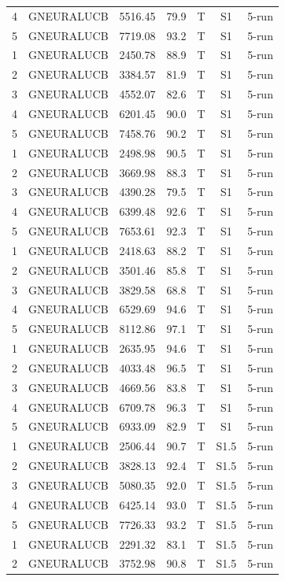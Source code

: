 \documentclass[11pt]{article}
\begin{document}
\begin{center}
\begin{longtable}{|c|c|c|c|c|c|c|}
4 & GNEURALUCB & 5516.45 & 79.9 & T & S1 & 5-run \\
5 & GNEURALUCB & 7719.08 & 93.2 & T & S1 & 5-run \\
1 & GNEURALUCB & 2450.78 & 88.9 & T & S1 & 5-run \\
2 & GNEURALUCB & 3384.57 & 81.9 & T & S1 & 5-run \\
3 & GNEURALUCB & 4552.07 & 82.6 & T & S1 & 5-run \\
4 & GNEURALUCB & 6201.45 & 90.0 & T & S1 & 5-run \\
5 & GNEURALUCB & 7458.76 & 90.2 & T & S1 & 5-run \\
1 & GNEURALUCB & 2498.98 & 90.5 & T & S1 & 5-run \\
2 & GNEURALUCB & 3669.98 & 88.3 & T & S1 & 5-run \\
3 & GNEURALUCB & 4390.28 & 79.5 & T & S1 & 5-run \\
4 & GNEURALUCB & 6399.48 & 92.6 & T & S1 & 5-run \\
5 & GNEURALUCB & 7653.61 & 92.3 & T & S1 & 5-run \\
1 & GNEURALUCB & 2418.63 & 88.2 & T & S1 & 5-run \\
2 & GNEURALUCB & 3501.46 & 85.8 & T & S1 & 5-run \\
3 & GNEURALUCB & 3829.58 & 68.8 & T & S1 & 5-run \\
4 & GNEURALUCB & 6529.69 & 94.6 & T & S1 & 5-run \\
5 & GNEURALUCB & 8112.86 & 97.1 & T & S1 & 5-run \\
1 & GNEURALUCB & 2635.95 & 94.6 & T & S1 & 5-run \\
2 & GNEURALUCB & 4033.48 & 96.5 & T & S1 & 5-run \\
3 & GNEURALUCB & 4669.56 & 83.8 & T & S1 & 5-run \\
4 & GNEURALUCB & 6709.78 & 96.3 & T & S1 & 5-run \\
5 & GNEURALUCB & 6933.09 & 82.9 & T & S1 & 5-run \\
1 & GNEURALUCB & 2506.44 & 90.7 & T & S1.5 & 5-run \\
2 & GNEURALUCB & 3828.13 & 92.4 & T & S1.5 & 5-run \\
3 & GNEURALUCB & 5080.35 & 92.0 & T & S1.5 & 5-run \\
4 & GNEURALUCB & 6425.14 & 93.0 & T & S1.5 & 5-run \\
5 & GNEURALUCB & 7726.33 & 93.2 & T & S1.5 & 5-run \\
1 & GNEURALUCB & 2291.32 & 83.1 & T & S1.5 & 5-run \\
2 & GNEURALUCB & 3752.98 & 90.8 & T & S1.5 & 5-run \\

\end{longtable}
\end{center}
\end{document}
